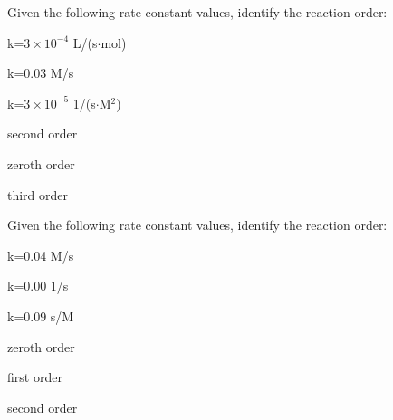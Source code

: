 \documentclass[main.tex]{subfiles}
\begin{document}
\begin{multicols*}{2}
\begin{question}[ID=\the\value{numA}]
Given the following rate constant values, identify the reaction order:
\begin{inparaenum}[(a)]
\item  k=$3\times 10^{-4}$ L/(s$\cdot$mol) %
\item k=0.03 M/s %
\item  k=$3\times 10^{-5}$ 1/(s$\cdot$M$^2$) %
\end{inparaenum}
\end{question}
\begin{solution}
\begin{inparaenum}[(a)]
\item   second order 
\item  zeroth order 
\item   third order 
\end{inparaenum}\hspace{0.1cm}\end{solution}%
	    	         
                 
\begin{question}[ID=\the\value{numA}]
Given the following rate constant values, identify the reaction order:
\begin{inparaenum}[(a)]
\item  k=0.04 M/s  	%
\item   k=0.00 1/s 	%
\item  k=0.09 s/M	%

\end{inparaenum}
\end{question}
\begin{solution}
\begin{inparaenum}[(a)]
\item    zeroth order 
\item    first order 
\item   second order 
\end{inparaenum}\hspace{0.1cm}\end{solution}%



\end{multicols*}
\end{document}
